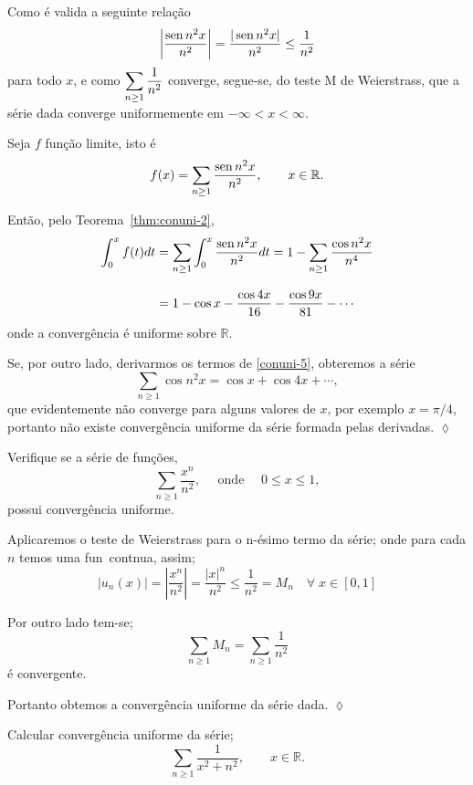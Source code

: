 \solo Como é valida a seguinte relação
\begin{equation*}
  \left|\frac{\operatorname{sen} n^2x}{n^2 }\right|=\frac{|\operatorname{sen} n^2x|}{n^2}\leq \frac{1}{n^2}
\end{equation*}
para todo $x$, e como $\displaystyle{\sum_{n\geq 1}\frac{1}{n^2}}$
converge, segue-se, do teste M de Weierstrass, que a série dada
converge uniformemente em $-\infty< x < \infty$.

Seja $f$ função limite, isto é
\begin{equation*}
  f(x)=\sum_{n\geq 1}\frac{\operatorname{sen} n^2 x}{n^2},\qquad x\in
  \mathbb{R}.
\end{equation*}

Então, pelo Teorema~\ref{thm:conuni-2},
\begin{align*}
\int_0^x f(t)dt &= \sum_{n\geq 1}\int_0^x\frac{\operatorname{sen} n^2 x}{n^2}dt
=1-\sum_{n\geq 1}\frac{\cos n^2 x}{n^4}\\[2ex]
  &=1-\cos x- \frac{\cos 4x}{16}-\frac{\cos 9x}{81}-\cdots
\end{align*}
onde a convergência é uniforme sobre $\mathbb{R}$.

Se, por outro lado, derivarmos os termos de \eqref{conuni-5},
obteremos a série
\begin{equation*}
  \sum_{n\geq 1}\cos n^2 x=\cos x + \cos 4x+\cdots,
\end{equation*}
que evidentemente não converge para alguns valores de $x$, por
exemplo $x=\pi/4$, portanto não existe convergência uniforme da
série formada pelas derivadas. \hfill \(\lozenge\)

\begin{exer}
 Verifique se a série de funções,
$$
\sum_{n\geq 1}\frac{x^{n}}{n^2}, \quad \text{ onde } \quad 0\leq x
\leq 1,
$$
possui converg\^encia uniforme.
\end{exer}

\solo Aplicaremos o teste de Weierstrass para o n-\'esimo termo da
s\'erie; onde para cada $n$ temos uma fun\cao\ cont\ii nua, assim;
$$
|u_n(x)|=\left|\frac{x^n}{n^2}\right|=\frac{|x|^n}{n^2}\leq
\frac{1}{n^2}=M_n \quad \forall\; x\in [0,1]
$$

Por outro lado tem-se;
$$
\sum_{n\geq 1} M_n=\sum_{n\geq 1} \frac{1}{n^2}
$$
\'e convergente.

Portanto obtemos a convergência uniforme da s\'erie dada.
\hfill \(\lozenge\)

\begin{exer}
Calcular converg\^encia uniforme da s\'erie;
$$
\sum_{n\geq 1}\frac{1}{x^2+n^2},\qquad x\in \mathbb{R}.
$$
\end{exer}

